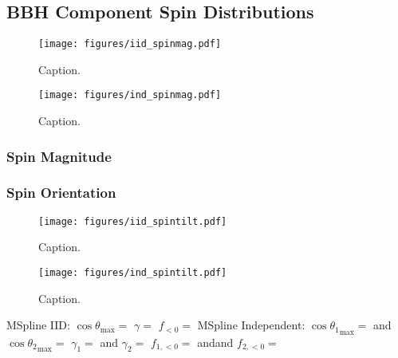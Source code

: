 \subsection{BBH Component Spin Distributions} \label{sec:spin_dist}

\begin{figure}
    \texttt{[image: figures/iid\_spinmag.pdf]}
    \caption{Caption.}
    \label{fig:iid_spinmag_dist}
\end{figure}
\begin{figure}
    \texttt{[image: figures/ind\_spinmag.pdf]}
    \caption{Caption.}
    \label{fig:ind_spinmag_dist}
\end{figure}

\subsubsection{Spin Magnitude}

\subsubsection{Spin Orientation}

\begin{figure}
    \texttt{[image: figures/iid\_spintilt.pdf]}
    \caption{Caption.}
    \label{fig:iid_spintilt_dist}
\end{figure}
\begin{figure}
        \texttt{[image: figures/ind\_spintilt.pdf]}
        \caption{Caption.}
        \label{fig:ind_spintilt_dist}
\end{figure}

MSpline IID:
$\cos{\theta}_\mathrm{max} = $\result{$\CIPlusMinus{\macros[MSplineIIDCompSpins][peakCosTilt]}$}
$\gamma = $
$f_{<0} = $\result{$\CIPlusMinus{\macros[MSplineIIDCompSpins][negFrac]}$}
MSpline Independent:
$\cos{\theta_1}_\mathrm{max} = $\result{$\CIPlusMinus{\macros[MSplineIndependentCompSpins][peakCosTilt1]}$} and $\cos{\theta_2}_\mathrm{max} = $\result{$\CIPlusMinus{\macros[MSplineIndependentCompSpins][peakCosTilt2]}$}
$\gamma_1 = $ and $\gamma_2 = $ 
$f_{1,<0} = $\result{$\CIPlusMinus{\macros[MSplineIndependentCompSpins][negFrac1]}$} andand $f_{2,<0} = $\result{$\CIPlusMinus{\macros[MSplineIndependentCompSpins][negFrac2]}$}

